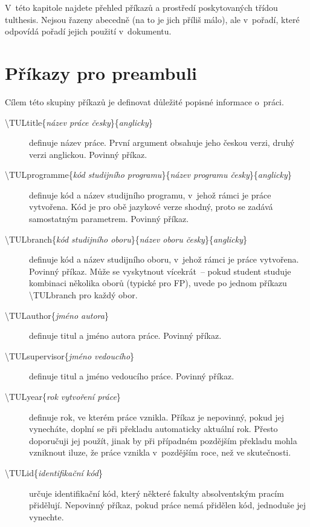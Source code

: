 \documentclass[FM,DP]{tulthesis}
\newcommand{\argument}[1]{{\ttfamily\color{\tulcolor}#1}}
\newcommand{\prikaz}[1]{\argument{\textbackslash #1}}
\begin{document}
V~této kapitole najdete přehled příkazů a prostředí poskytovaných třídou
\argument{tulthesis}. Nejsou řazeny abecedně (na to je jich příliš málo), ale
v~pořadí, které odpovídá pořadí jejich použití v~dokumentu.


\section{Příkazy pro preambuli}

Cílem této skupiny příkazů je definovat důležité popisné informace o~práci.

\begin{description}

\item[\prikaz{TULtitle\{\emph{název práce česky}\}\{\emph{anglicky}\}}]
definuje název práce. První argument obsahuje jeho českou verzi, druhý verzi
anglickou. Povinný příkaz.

\item[\prikaz{TULprogramme\{\emph{kód studijního programu}\}\{\emph{název
programu česky}\}\{\emph{anglicky}\}}] definuje kód a název studijního
programu, v~jehož rámci je práce vytvořena. Kód je pro obě jazykové verze
shodný, proto se zadává samostatným parametrem. Povinný příkaz.

\item[\prikaz{TULbranch\{\emph{kód studijního oboru}\}\{\emph{název
oboru česky}\}\{\emph{anglicky}\}}] definuje kód a název studijního
oboru, v~jehož rámci je práce vytvořena. Povinný příkaz. Může se vyskytnout
vícekrát~-- pokud student studuje kombinaci několika oborů (typické pro FP),
uvede po jednom příkazu \prikaz{TULbranch} pro každý obor.

\item[\prikaz{TULauthor\{\emph{jméno autora}\}}] definuje titul a jméno autora
práce. Povinný příkaz.

\item[\prikaz{TULsupervisor\{\emph{jméno vedoucího}\}}] definuje titul a jméno
vedoucího práce. Povinný příkaz.

\item[\prikaz{TULyear\{\emph{rok vytvoření práce}\}}] definuje rok, ve kterém
práce vznikla. Příkaz je nepovinný, pokud jej vynecháte, doplní se při překladu
automaticky aktuální rok. Přesto doporučuji jej použít, jinak by při případném
pozdějším překladu mohla vzniknout iluze, že práce vznikla v~pozdějším roce,
než ve skutečnosti.

\item[\prikaz{TULid\{\emph{identifikační kód}\}}] určuje identifikační kód,
který některé fakulty absolventským pracím přidělují. Nepovinný příkaz, pokud
práce nemá přidělen kód, jednoduše jej vynechte.


\end{description}
\end{document}
